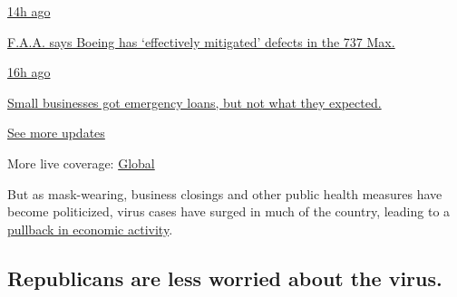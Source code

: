 \href{https://www.nytimes3xbfgragh.onion/live/2020/08/03/business/stock-market-today-coronavirus?action=click\&pgtype=Article\&state=default\&region=MAIN_CONTENT_1\&context=storylines_live_updates\#faa-says-boeing-has-effectively-mitigated-defects-in-the-737-max}{14h
ago}

\href{https://www.nytimes3xbfgragh.onion/live/2020/08/03/business/stock-market-today-coronavirus?action=click\&pgtype=Article\&state=default\&region=MAIN_CONTENT_1\&context=storylines_live_updates\#faa-says-boeing-has-effectively-mitigated-defects-in-the-737-max}{F.A.A.
says Boeing has `effectively mitigated' defects in the 737 Max.}

\href{https://www.nytimes3xbfgragh.onion/live/2020/08/03/business/stock-market-today-coronavirus?action=click\&pgtype=Article\&state=default\&region=MAIN_CONTENT_1\&context=storylines_live_updates\#small-businesses-got-emergency-loans-but-not-what-they-expected}{16h
ago}

\href{https://www.nytimes3xbfgragh.onion/live/2020/08/03/business/stock-market-today-coronavirus?action=click\&pgtype=Article\&state=default\&region=MAIN_CONTENT_1\&context=storylines_live_updates\#small-businesses-got-emergency-loans-but-not-what-they-expected}{Small
businesses got emergency loans, but not what they expected.}

\href{https://www.nytimes3xbfgragh.onion/live/2020/08/03/business/stock-market-today-coronavirus?action=click\&pgtype=Article\&state=default\&region=MAIN_CONTENT_1\&context=storylines_live_updates}{See
more updates}

More live coverage:
\href{https://www.nytimes3xbfgragh.onion/2020/08/04/world/coronavirus-covid-19.html?action=click\&pgtype=Article\&state=default\&region=MAIN_CONTENT_1\&context=storylines_live_updates}{Global}

But as mask-wearing, business closings and other public health measures
have become politicized, virus cases have surged in much of the country,
leading to a
\href{https://www.nytimes3xbfgragh.onion/2020/07/15/business/economy/economic-recovery-coronavirus-resurgence.html}{pullback
in economic activity}.

\hypertarget{republicans-are-less-worried-about-the-virus}{%
\subsection{Republicans are less worried about the
virus.}\label{republicans-are-less-worried-about-the-virus}}

